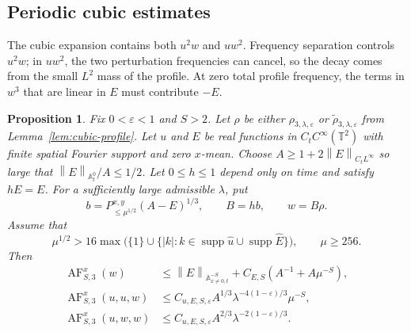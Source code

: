 \documentclass[12pt,reqno,letterpaper]{amsart}
\numberwithin{equation}{section}
\newtheorem{proposition}[theorem]{Proposition}
\theoremstyle{definition}
\newcommand{\T}{\mathbb T}
\newcommand{\A}{\mathbb A}
\newcommand{\eps}{\varepsilon}
\newcommand{\la}{\lambda}
\newcommand{\supp}{\operatorname{supp}}
\newcommand{\norm}[1]{\left\lVert #1\right\rVert}
\newcommand{\abs}[1]{\left\lvert #1\right\rvert}
\begin{document}
\subsection{Periodic cubic estimates}

The cubic expansion contains both $u^2w$ and $uw^2$.  Frequency separation
controls $u^2w$; in $uw^2$, the two perturbation frequencies can cancel,
so the decay comes from the small $L^2$ mass of the profile.  At zero total
profile frequency, the terms in $w^3$ that are linear in $E$ must
contribute $-E$.

\begin{proposition}
\label{prop:cubic-periodic-estimate}
Fix $0<\eps<1$ and $S>2$.  Let $\rho$ be either
$\rho_{3,\la,\eps}$ or
$\widetilde{\rho}_{3,\la,\eps}$ from
Lemma~\ref{lem:cubic-profile}.  Let $u$ and $E$ be real functions in
$C_tC^\infty(\T^2)$ with finite spatial Fourier support and zero
$x$-mean.  Choose
$A\geq1+2\norm E_{C_tL^\infty}$ so large that
$\norm E_{\A^0_t}/A\leq1/2$.  Let $0\leq h\leq1$ depend only on time
and satisfy $hE=E$.  For a sufficiently large admissible $\la$,
put
\begin{equation*}
 b=P_{\leq\mu^{1/2}}^{x,y}(A-E)^{1/3},
 \qquad B=hb,
 \qquad w=B\rho.
\end{equation*}
Assume that
\[
 \mu^{1/2}>16\max\bigl(\{1\}\cup
 \{\abs k:k\in\supp\widehat u\cup\supp\widehat E\}\bigr),
 \qquad \mu\geq256.
\]
Then
\begin{align*}
 \operatorname{AF}_{S,3}^x(w)
 &\leq\norm E_{\A^{-S}_{x\neq0,t}}
   +C_{E,S}\left(A^{-1}+A\mu^{-S}\right),\\
 \operatorname{AF}_{S,3}^x(u,u,w)
 &\leq C_{u,E,S,\eps}A^{1/3}
   \la^{-4(1-\eps)/3}\mu^{-S},\\
 \operatorname{AF}_{S,3}^x(u,w,w)
 &\leq C_{u,E,S,\eps}A^{2/3}
   \la^{-2(1-\eps)/3}.
\end{align*}
\end{proposition}
\end{document}
